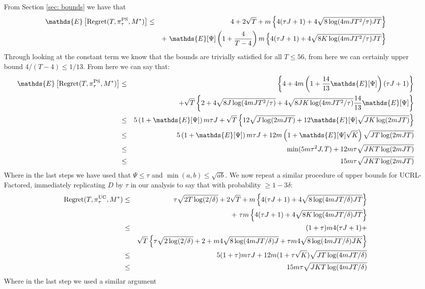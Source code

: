 \documentclass{article}
\newcommand{\Exp}{\mathds{E}}
\begin{document}
From Section \ref{sec: bounds} we have that
\begin{eqnarray*}
	\Exp \left[\mathrm{Regret}(T, \pi^{\rm PS}_{\tau}, M^*) \right] &\le& 4 +2 \sqrt{T} +
		m \left\{ 4(\tau J + 1) + 4\sqrt{8 \log(4mJ T^2/\tau) J T} \right\} \\
		&&+ \  \Exp[\Psi]\left(1 + \frac{4}{T-4}\right) m \left\{ 4(\tau J + 1) + 4\sqrt{8 K \log(4mJ T^2 / \tau) J T} \right\}
\end{eqnarray*}
Through looking at the constant term we know that the bounds are trivially satisfied for all $T\le 56$, from here we can certainly upper bound $4/(T-4) \le 1/13$.
From here we can say that:
\begin{eqnarray*}
	\Exp \left[\mathrm{Regret}(T, \pi^{\rm PS}_{\tau}, M^*) \right] &\le& \left\{ 4 + 4m\left(1 + \frac{14}{13} \Exp[\Psi]\right)(\tau J +1) \right\} \\
		&& + \sqrt{T} \left\{ 2 + 4\sqrt{8J \log(4mJ T^2/\tau)} + 4\sqrt{8 JK \log(4mJ T^2/\tau)} \frac{14}{13} \Exp[\Psi] \right\} \\
	&\le& 5 \left( 1 + \Exp[\Psi] \right) m \tau J + \sqrt{T} \left\{ 12\sqrt{J\log(2mJ T)} + 12\Exp[\Psi] \sqrt{JK\log(2mJ T)} \right\} \\
	&\le& 5 \left( 1 + \Exp[\Psi] \right) m \tau J + 12m\left( 1 + \Exp[ \Psi] \sqrt{K} \right) \sqrt{J T\log(2mJ T)} \\
	&\le& \min(5 m \tau^2 J, T) + 12m \tau \sqrt{J K T \log(2mJ T)} \\
	&\le& 15m \tau \sqrt{J K T \log(2mJ T)}
\end{eqnarray*}
Where in the last steps we have used that $\Psi \le \tau$ and $\min(a,b) \le \sqrt{ab}$.
We now repeat a similar procedure of upper bounds for UCRL-Factored, immediately replicating $D$ by $\tau$ in our analysis to say that with probability $\ge 1- 3\delta$:
\begin{eqnarray*}
	\mathrm{Regret}(T, \pi^{\rm UC}_{\tau}, M^*) &\le& \tau \sqrt{2T \log(2/\delta)} + 2\sqrt{T} +
		m \left\{ 4(\tau J + 1) + 4\sqrt{8 \log(4mJ T/\delta) J T} \right\} \\
		&&+ \  \tau m \left\{ 4(\tau J + 1) + 4\sqrt{8 K \log(4mJ T / \delta) J T} \right\}\\
		&\le& (1+\tau)m4(\tau J + 1) + \\
		  &&\sqrt{T} \left\{ \tau \sqrt{2 \log(2/\delta)} + 2 +  m4\sqrt{8 \log(4mJ T / \delta) J} + \tau m 4 \sqrt{8 \log(4mJ T / \delta) JK} \right\} \\
		&\le& 5(1+\tau)m\tau J + 12m(1 + \tau \sqrt{K}) \sqrt{J T \log(4mJT / \delta)} \\
		&\le& 15m \tau \sqrt{J K T \log(4mJ T / \delta)}
\end{eqnarray*}
Where in the last step we used a similar argument 

\end{document}
